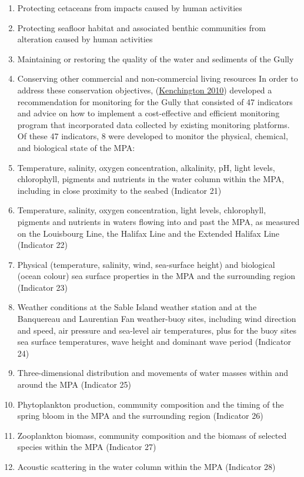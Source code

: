\documentclass[12pt]{article}\usepackage[]{graphicx}\usepackage[]{color}
\begin{document}
\begin{enumerate}
\def\labelenumi{\arabic{enumi})}
\item
  Protecting cetaceans from impacts caused by human activities
\item
  Protecting seafloor habitat and associated benthic communities from alteration caused by human activities
\item
  Maintaining or restoring the quality of the water and sediments of the Gully
\item
  Conserving other commercial and non-commercial living resources In order to address these conservation objectives, (\protect\hyperlink{ref-kenchington_2010}{Kenchington 2010}) developed a recommendation for monitoring for the Gully that consisted of 47 indicators and advice on how to implement a cost-effective and efficient monitoring program that incorporated data collected by existing monitoring platforms. Of these 47 indicators, 8 were developed to monitor the physical, chemical, and biological state of the MPA:
\item
  Temperature, salinity, oxygen concentration, alkalinity, pH, light levels, chlorophyll, pigments and nutrients in the water column within the MPA, including in close proximity to the seabed (Indicator 21)
\item
  Temperature, salinity, oxygen concentration, light levels, chlorophyll, pigments and nutrients in waters flowing into and past the MPA, as measured on the Louisbourg Line, the Halifax Line and the Extended Halifax Line (Indicator 22)
\item
  Physical (temperature, salinity, wind, sea-surface height) and biological (ocean colour) sea surface properties in the MPA and the surrounding region (Indicator 23)
\item
  Weather conditions at the Sable Island weather station and at the Banquereau and Laurentian Fan weather-buoy sites, including wind direction and speed, air pressure and sea-level air temperatures, plus for the buoy sites sea surface temperatures, wave height and dominant wave period (Indicator 24)
\item
  Three-dimensional distribution and movements of water masses within and around the MPA (Indicator 25)
\item
  Phytoplankton production, community composition and the timing of the spring bloom in the MPA and the surrounding region (Indicator 26)
\item
  Zooplankton biomass, community composition and the biomass of selected species within the MPA (Indicator 27)
\item
  Acoustic scattering in the water column within the MPA (Indicator 28)
\end{enumerate}
\end{document}
